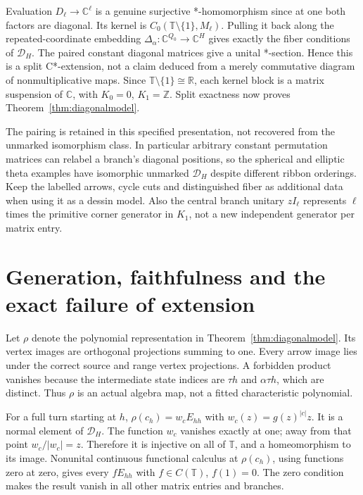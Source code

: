 \documentclass[11pt,oneside,openany]{book}
\theoremstyle{definition}\newtheorem{definition}[theorem]{Definition}
\theoremstyle{remark}\newtheorem{remark}[theorem]{Remark}
\newcommand{\C}{\mathbb C}\newcommand{\Z}{\mathbb Z}\newcommand{\R}{\mathbb R}
\begin{document}
Evaluation $D_\ell\to\C^\ell$ is a genuine surjective *-homomorphism since at one both factors are diagonal. Its kernel is $C_0(\mathbb T\setminus\{1\},M_\ell)$. Pulling it back along the repeated-coordinate embedding $\Delta_\alpha:\C^{Q_0}\to\C^H$ gives exactly the fiber conditions of $\mathcal D_H$. The paired constant diagonal matrices give a unital *-section. Hence this is a split C*-extension, not a claim deduced from a merely commutative diagram of nonmultiplicative maps. Since $\mathbb T\setminus\{1\}\cong\R$, each kernel block is a matrix suspension of $\C$, with $K_0=0$, $K_1=\Z$. Split exactness now proves Theorem~\ref{thm:diagonalmodel}.

The pairing is retained in this specified presentation, not recovered from the unmarked isomorphism class. In particular arbitrary constant permutation matrices can relabel a branch's diagonal positions, so the spherical and elliptic theta examples have isomorphic unmarked $\mathcal D_H$ despite different ribbon orderings. Keep the labelled arrows, cycle cuts and distinguished fiber as additional data when using it as a dessin model. Also the central branch unitary $zI_\ell$ represents $\ell$ times the primitive corner generator in $K_1$, not a new independent generator per matrix entry.

\section{Generation, faithfulness and the exact failure of extension}
Let $\rho$ denote the polynomial representation in Theorem~\ref{thm:diagonalmodel}. Its vertex images are orthogonal projections summing to one. Every arrow image lies under the correct source and range vertex projections. A forbidden product vanishes because the intermediate state indices are $\tau h$ and $\alpha\tau h$, which are distinct. Thus $\rho$ is an actual algebra map, not a fitted characteristic polynomial.

For a full turn starting at $h$, $\rho(c_h)=w_cE_{hh}$ with $w_c(z)=g(z)^{|c|}z$. It is a normal element of $\mathcal D_H$. The function $w_c$ vanishes exactly at one; away from that point $w_c/|w_c|=z$. Therefore it is injective on all of $\mathbb T$, and a homeomorphism to its image. Nonunital continuous functional calculus at $\rho(c_h)$, using functions zero at zero, gives every $fE_{hh}$ with $f\in C(\mathbb T)$, $f(1)=0$. The zero condition makes the result vanish in all other matrix entries and branches.
\end{document}
